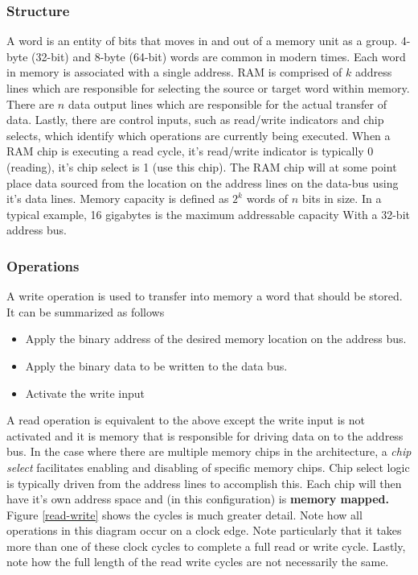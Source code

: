 \documentclass[10pt,a4paper]{article}
\begin{document}
\subsubsection{Structure}
A word is an entity of bits that moves in and out of a memory unit as a group. 4-byte (32-bit) and 8-byte (64-bit) words are common in modern times. Each word in memory is associated with a single address. RAM is comprised of $k$ address lines which are responsible for selecting the source or target word within memory. There are $n$ data output lines which are responsible for the actual transfer of data. Lastly, there are control inputs, such as read/write indicators and chip selects, which identify which operations are currently being executed. When a RAM chip is executing a read cycle, it's read/write indicator is typically 0 (reading), it's chip select is 1 (use this chip). The RAM chip will at some point place data sourced from the location on the address lines on the data-bus using it's data lines. 
\newline\newline
Memory capacity is defined as $2^{k}$ words of $n$ bits in size. In a typical example, 16 gigabytes is the maximum addressable capacity With a 32-bit address bus. 
\subsubsection{Operations}
A write operation is used to transfer into memory a word that should be stored. It can be summarized as follows
\begin{itemize}
\item Apply the binary address of the desired memory location on the address bus.
\item Apply the binary data to be written to the data bus.
\item Activate the write input
\end{itemize}
A read operation is equivalent to the above except the write input is not activated and it is memory that is responsible for driving data on to the address bus. In the case where there are multiple memory chips in the architecture, a \textit{chip select} facilitates enabling and disabling of specific memory chips. Chip select logic is typically driven from the address lines to accomplish this. Each chip will then have it's own address space and (in this configuration) is \textbf{memory mapped.} Figure \ref{read-write} shows the cycles is much greater detail. Note how all operations in this diagram occur on a clock edge. Note particularly that it takes more than one of these clock cycles to complete a full read or write cycle. Lastly, note how the full length of the read write cycles are not necessarily the same. 
\end{document}
